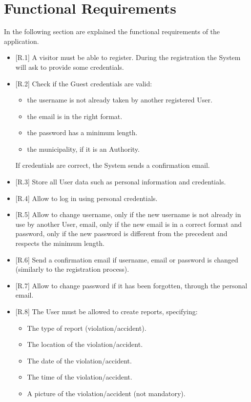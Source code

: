 \documentclass{report}
\begin{document}
\section{Functional Requirements}
In the following section are explained the functional requirements of the application.
\begin{itemize}
	\item {[R.1]} A visitor must be able to register. During the registration the System will ask to provide some credentials.
	\item {[R.2]} Check if the Guest credentials are valid:
		\begin{itemize}
			\item the username is not already taken by another registered User.
			\item the email is in the right format.
			\item the password has a minimum length.
			\item the municipality, if it is an Authority.
		\end{itemize}
		If credentials are correct, the System sends a confirmation email.
	\item {[R.3]} Store all User data such as personal information and credentials.
	\item {[R.4]} Allow to log in using personal credentials.
	\item {[R.5]} Allow to change username, only if the new username is not already in use by another User, email, only if the
	new email is in a correct format and password, only if the new password is different from the precedent and respects the minimum length.
	\item {[R.6]} Send a confirmation email if username, email or password is changed (similarly to the registration process). 
	\item {[R.7]} Allow to change password if it has been forgotten, through the personal email.
	\item {[R.8]} The User must be allowed to create reports, specifying:
		\begin{itemize}
			\item The type of report (violation/accident).
			\item The location of the violation/accident.
			\item The date of the violation/accident.
			\item The time of the violation/accident.
			\item A picture of the violation/accident (not mandatory).
		\end{itemize}

\end{itemize}
\end{document}
